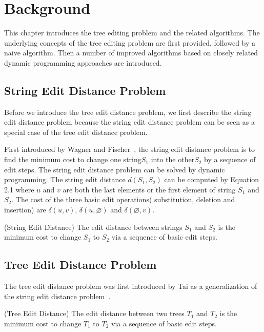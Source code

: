 \doublespacing
\chapter{Background}
This chapter introduces the tree editing problem and the related algorithms. The underlying concepts of the tree editing problem are first provided, followed by a naive algorithm. Then a number of improved algorithms based on closely related dynamic programming approaches are introduced. 

\section{String Edit Distance Problem}
Before we introduce the tree edit distance problem, we first describe the string edit distance problem because the string edit distance problem can be seen as a special case of the tree edit distance problem.

First introduced by Wagner and Fischer~\cite{wagner1974string}, the string edit distance problem is to find the minimum cost to change one string$S_1$ into the other$S_2$ by a sequence of edit steps. The string edit distance problem can be solved by dynamic programming. The string edit distance $d(S_1, S_2)$ can be computed by Equation 2.1  where $u$ and $v$ are both the last elements or the first element of string $S_1$ and $S_2$. The cost of the three basic edit operations( substitution, deletion and insertion) are $\delta(u, v)$, $\delta(u, \varnothing)$ and $\delta(\varnothing, v)$.

\begin{definition}
(String Edit Distance)
The edit distance between strings $S_1$ and $S_2$ is the minimum cost to change $S_1$ to $S_2$ via a sequence of basic edit steps. 
\end{definition}

\section{Tree Edit Distance Problem}

The tree edit distance problem was first introduced by Tai as a generalization of the string edit distance problem~\cite{wagner1974string}. 

\begin{definition}
(Tree Edit Distance)
The edit distance between two trees $T_1$ and $T_2$ is the minimum cost to change $T_1$ to $T_2$ via a sequence of basic edit steps. 
\end{definition}


